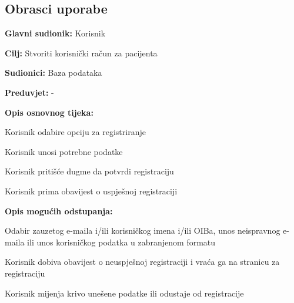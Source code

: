 \eject 



\subsection{Obrasci uporabe}


\noindent {}
\begin{packed_item}
	
	\item \textbf{Glavni sudionik: }Korisnik
	\item  \textbf{Cilj:} Stvoriti korisnički račun za pacijenta
	\item  \textbf{Sudionici:} Baza podataka
	\item  \textbf{Preduvjet:} -
	\item  \textbf{Opis osnovnog tijeka:}
	
	\item[] \begin{packed_enum}
		
		\item Korisnik odabire opciju za registriranje
		\item Korisnik unosi potrebne podatke
		\item Korisnik pritišće dugme da potvrdi registraciju
		\item Korisnik prima obavijest o uspješnoj registraciji
	\end{packed_enum}
	
	\item  \textbf{Opis mogućih odstupanja:}
	
	\item[] \begin{packed_item}
		
		\item[2.a] Odabir zauzetog e-maila i/ili korisničkog imena i/ili OIBa, unos neispravnog e-maila ili unos korisničkog podatka u zabranjenom formatu
		\item[] \begin{packed_enum}
			
			\item Korisnik dobiva obavijest o neuspješnoj registraciji i vraća ga na stranicu za registraciju
			\item Korisnik mijenja krivo unešene podatke ili odustaje od registracije
			
		\end{packed_enum}
		
	\end{packed_item}
\end{packed_item}

